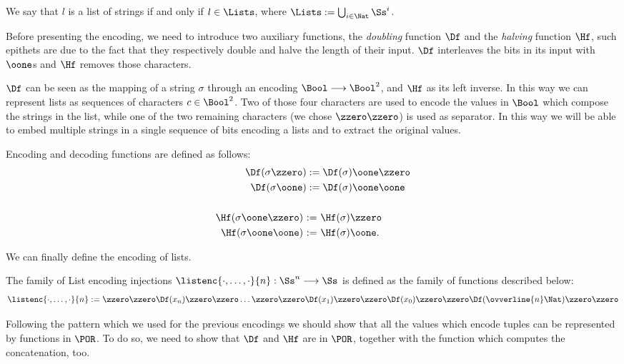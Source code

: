 \begin{conditional}{\notappendix}
  \begin{defn}
    \label{def:enclists}
    We say that $l$ is a list of strings if and only if $l \in \Lists$, where
    $\Lists := \bigcup_{i\in \Nat} \Ss^i$.
  \end{defn}

  Before presenting the encoding, we need to introduce two auxiliary functions,
  the \emph{doubling} function $\Df$ and the \emph{halving} function $\Hf$,
  such epithets are due to the fact that they respectively double and halve the length
  of their input. $\Df$ interleaves the bits in its input with $\oone$s and $\Hf$
  removes those characters.

  $\Df$ can be seen as the mapping of a string $\sigma$ through an
  encoding $\Bool \longrightarrow \Bool^2$, and $\Hf$ as
  its left inverse. In this way we can represent lists as sequences of characters
  $c \in \Bool^2$. Two of those four characters are used to encode the
  values in $\Bool$ which compose the strings in the list, while
  one of the two remaining characters (we chose $\zzero\zzero$) is used
  as separator. In this way we will be able to embed multiple strings in a single
  sequence of bits encoding a lists and to extract the original values.

  \begin{defn}
    \label{def:df}
  Encoding and decoding functions
  are defined as follows:
  \begin{align*}
  \Df(\sigma\zzero) &:= \Df(\sigma)\oone\zzero \\
  \Df(\sigma\oone) &:= \Df(\sigma)\oone\oone \\
  \\
  \Hf(\sigma\oone\zzero) \ &{:=} \
  \Hf(\sigma)\zzero \\
  \Hf(\sigma\oone\oone) \ &{:=} \ \Hf(\sigma)\oone.
  \end{align*}
  \end{defn}
  \noindent

  We can finally define the encoding
  of lists.


  \begin{defn}
  The family of List encoding injections
  $\listenc {\cdot, \ldots, \cdot}{n}: \Ss^n \longrightarrow \Ss$
  is defined
  as the family of functions described below:
  $$
  \listenc {\cdot, \ldots, \cdot}{n}
  := {\zzero\zzero \Df (x_n)
  \zzero\zzero
  \dots \zzero \zzero \Df(x_1) \zzero\zzero
  \Df(x_0)\zzero\zzero\Df(\ovverline{n}\Nat)
  \zzero\zzero}
  $$
  \end{defn}
  Following the pattern which we used for the previous encodings we should show
  that all the values which encode tuples can be represented by functions in
  $\POR$. To do so, we need to show that $\Df$ and $\Hf$ are in $\POR$, together
  with the function which computes the concatenation, too.


\end{conditional}
